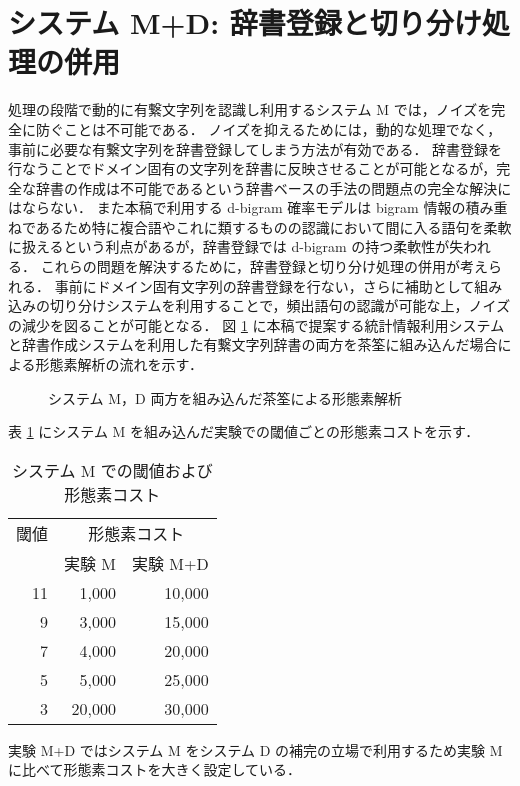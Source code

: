 \section{システム M+D: 辞書登録と切り分け処理の併用}
処理の段階で動的に有繋文字列を認識し利用するシステム M では，ノイズを完全に防ぐことは不可能である．
ノイズを抑えるためには，動的な処理でなく，事前に必要な有繋文字列を辞書登録してしまう方法が有効である．
辞書登録を行なうことでドメイン固有の文字列を辞書に反映させることが可能となるが，完全な辞書の作成は不可能であるという辞書ベースの手法の問題点の完全な解決にはならない．
また本稿で利用する d-bigram 確率モデルは bigram 情報の積み重ねであるため特に複合語やこれに類するものの認識において間に入る語句を柔軟に扱えるという利点があるが，辞書登録では d-bigram の持つ柔軟性が失われる．
これらの問題を解決するために，辞書登録と切り分け処理の併用が考えられる．
事前にドメイン固有文字列の辞書登録を行ない，さらに補助として組み込みの切り分けシステムを利用することで，頻出語句の認識が可能な上，ノイズの減少を図ることが可能となる．
図 \ref{fig:flo-md} に本稿で提案する統計情報利用システムと辞書作成システムを利用した有繋文字列辞書の両方を茶筌に組み込んだ場合による形態素解析の流れを示す．
\begin{figure}[hbt]
\begin{center}
\caption{システム M，D 両方を組み込んだ茶筌による形態素解析}
\label{fig:flo-md}
\end{center}
\end{figure}

表 \ref{tab:threshold} にシステム M を組み込んだ実験での閾値ごとの形態素コストを示す．
\begin{table}[hbt]
\begin{center}
\caption{システム M での閾値および形態素コスト}
\label{tab:threshold}
\begin{small}
\begin{tabular}{r|rr}
閾値&\multicolumn{2}{c}{形態素コスト}\\
    &実験 M & 実験 M+D \\
\hline
\hline
11& 1,000&10,000\\
 9& 3,000&15,000\\
 7& 4,000&20,000\\
 5& 5,000&25,000\\
 3&20,000&30,000\\
\end{tabular}
\end{small}
\end{center}
\end{table}
実験  M+D ではシステム  M をシステム D の補完の立場で利用するため実験 M に比べて形態素コストを大きく設定している．
